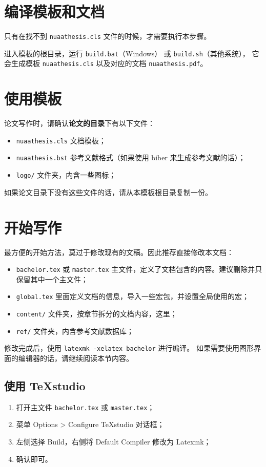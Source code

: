 \section{编译模板和文档}

只有在找不到 \verb|nuaathesis.cls| 文件的时候，才需要执行本步骤。

进入模板的根目录，运行 \verb|build.bat|（Windows） 或 \verb|build.sh|（其他系统），
它会生成模板 \verb|nuaathesis.cls| 以及对应的文档 \verb|nuaathesis.pdf|。

\section{使用模板}

论文写作时，请确认\textbf{论文的目录}下有以下文件：
\begin{itemize}
  \item \verb|nuaathesis.cls| 文档模板；
  \item \verb|nuaathesis.bst| 参考文献格式（如果使用 biber 来生成参考文献的话）；
  \item \verb|logo/| 文件夹，内含一些图标；
\end{itemize}

如果论文目录下没有这些文件的话，请从本模板根目录复制一份。

\section{开始写作}

最方便的开始方法，莫过于修改现有的文稿。因此推荐直接修改本文档：
\begin{itemize}
  \item \verb|bachelor.tex| 或 \verb|master.tex| 主文件，定义了文档包含的内容。建议删除并只保留其中一个主文件；
  \item \verb|global.tex| 里面定义文档的信息，导入一些宏包，并设置全局使用的宏；
  \item \verb|content/| 文件夹，按章节拆分的文档内容，这里；
  \item \verb|ref/| 文件夹，内含参考文献数据库；
\end{itemize}

修改完成后，使用 \verb|latexmk -xelatex bachelor| 进行编译。
如果需要使用图形界面的编辑器的话，请继续阅读本节内容。

\subsection{使用 TeXstudio}
\begin{enumerate}
\item 打开主文件 \verb|bachelor.tex| 或 \verb|master.tex|；
\item 菜单 Options > Configure TeXstudio 对话框；
\item 左侧选择 Build，右侧将 Default Compiler 修改为 Latexmk；
\item 确认即可。
\end{enumerate}


